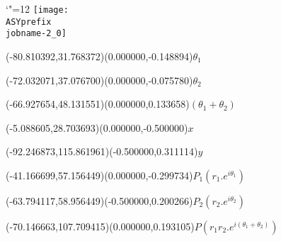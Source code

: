 \setlength{\unitlength}{1pt}%
\makeatletter%
\let\ASYencoding\f@encoding%
\let\ASYfamily\f@family%
\let\ASYseries\f@series%
\let\ASYshape\f@shape%
\makeatother%
{\catcode`"=12%
\texttt{[image: \\ASYprefix\\jobname-2\_0]}%
}%
%
\fontsize{6.000000}{7.200000}\selectfont%
\usefont{\ASYencoding}{\ASYfamily}{\ASYseries}{\ASYshape}%
\ASYalign(-80.810392,31.768372)(0.000000,-0.148894){$\theta_1$}%
%
\fontsize{6.000000}{7.200000}\selectfont%
\ASYalign(-72.032071,37.076700)(0.000000,-0.075780){$\theta_2$}%
%
\fontsize{6.000000}{7.200000}\selectfont%
\ASYalign(-66.927654,48.131551)(0.000000,0.133658){$(\theta_1 + \theta_2)$}%
%
\fontsize{6.000000}{7.200000}\selectfont%
\ASYalign(-5.088605,28.703693)(0.000000,-0.500000){$x$}%
%
\fontsize{6.000000}{7.200000}\selectfont%
\ASYalign(-92.246873,115.861961)(-0.500000,0.311114){$y$}%
%
\fontsize{6.000000}{7.200000}\selectfont%
\ASYalign(-41.166699,57.156449)(0.000000,-0.299734){$P_1(r_1.e^{i\theta_1})$}%
%
\fontsize{6.000000}{7.200000}\selectfont%
\ASYalign(-63.794117,58.956449)(-0.500000,0.200266){$P_2(r_2.e^{i\theta_2})$}%
%
\fontsize{6.000000}{7.200000}\selectfont%
\ASYalign(-70.146663,107.709415)(0.000000,0.193105){$P(r_1r_2.e^{i(\theta_1 + \theta_2)})$}%
